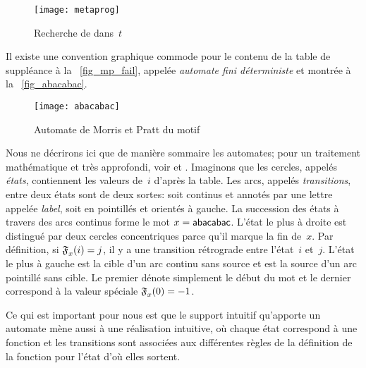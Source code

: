 %
\setlength{\intextsep}{0pt}
\begin{wrapfigure}[30]{r}[0pt]{0pt}
\centering
\texttt{[image: metaprog]}
\caption{Recherche de  dans~\(t\)%
\label{fig_metaprog}}
\end{wrapfigure}
Il existe une convention graphique commode pour le contenu de la table
de suppléance à la \fig~\vref{fig_mp_fail}, appelée \emph{automate
  fini déterministe} et montrée
à la \fig~\vref{fig_abacabac}.
\begin{figure}[b]
\centering
\texttt{[image: abacabac]}
\caption{Automate de Morris et Pratt du motif 
\label{fig_abacabac}}
\end{figure}
Nous ne décrirons ici que de manière sommaire les automates; pour un
traitement mathématique et très approfondi, voir
\cite{VanLeeuwen_1990c, HopcroftMotwaniUllman_2003} et
\cite{Sakarovitch_2003}. Imaginons que les cercles, appelés
\emph{états}, contiennent les valeurs de~\(i\) d'après la
table. Les arcs, appelés \emph{transitions}, entre
deux états sont de deux sortes: soit continus et annotés par une
lettre appelée \emph{label}, soit en pointillés et
orientés à gauche. La succession des états à travers des arcs continus
forme le mot \(x=\textsf{abacabac}\). L'état le plus à droite est
distingué par deux cercles concentriques parce qu'il marque la fin
de~\(x\). Par définition, si \(\mathfrak{F}_{x}^{}(i) = j\), il y a une
transition rétrograde entre l'état~\(i\) et~\(j\). L'état le plus à
gauche est la cible d'un arc continu sans source et est la source d'un
arc pointillé sans cible. Le premier dénote simplement le début du mot
et le dernier correspond à la valeur spéciale \(\mathfrak{F}_{x}^{}(0) =
-1\).

Ce qui est important pour nous est que le support intuitif qu'apporte
un automate mène aussi à une réalisation intuitive, où chaque état
correspond à une fonction et les transitions sont associées aux
différentes règles de la définition de la fonction pour l'état d'où
elles sortent.

